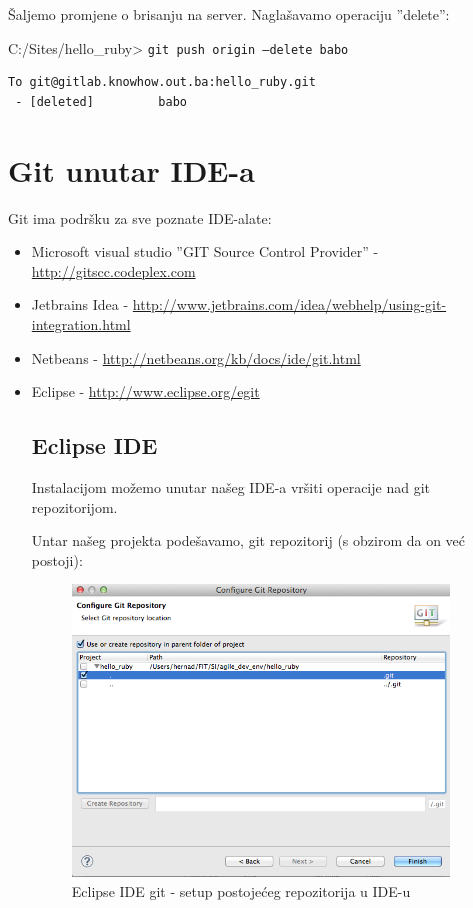 \documentclass[times, utf8, seminar]{fit}
\begin{document}
Šaljemo promjene o brisanju na server. Naglašavamo operaciju ''delete'':

C:/Sites/hello\_ruby> \texttt{git push origin --delete babo}
\begin{lstlisting}
To git@gitlab.knowhow.out.ba:hello_ruby.git
 - [deleted]         babo
\end{lstlisting}

\section{Git unutar IDE-a}

Git ima podršku za sve poznate IDE-alate:

\begin{itemize}
  \item Microsoft visual studio ''GIT Source Control Provider'' - \url{http://gitscc.codeplex.com}
  \item Jetbrains Idea - \url{http://www.jetbrains.com/idea/webhelp/using-git-integration.html}
  \item Netbeans - \url{http://netbeans.org/kb/docs/ide/git.html}
  \item Eclipse - \url{http://www.eclipse.org/egit}

\subsection{Eclipse IDE}

Instalacijom \href{http://www.vogella.com/articles/EGit/article.html}{\color{blue}{EGit plugin-a}} možemo unutar našeg IDE-a vršiti operacije nad git repozitorijom.

Untar našeg projekta podešavamo, git repozitorij (s obzirom da on već postoji):
\begin{figure}[H]
\centering
\includegraphics[width=10cm]{img/eclipse_git_01.png}
\caption{Eclipse IDE git - setup postojećeg repozitorija u IDE-u}
\end{figure}


\end{itemize}
\end{document}
